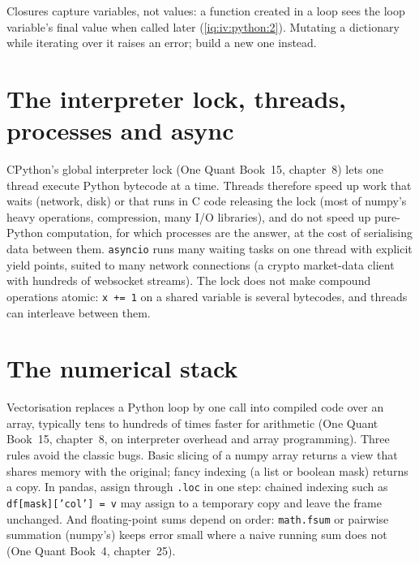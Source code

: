 \label{lst:iv:python:pipeline}

Closures capture variables, not values: a function created in a loop sees the loop variable's final value when called later
(\cref{iq:iv:python:2}). Mutating a dictionary while iterating over it raises an error; build a new one instead.

\section{The interpreter lock, threads, processes and async}

CPython's global interpreter lock (One Quant Book~15, chapter~8) lets one thread execute Python bytecode at a time. Threads
therefore speed up work that waits (network, disk) or that runs in C code releasing the lock (most of numpy's heavy
operations, compression, many I/O libraries), and do not speed up pure-Python computation, for which processes are the answer,
at the cost of serialising data between them. \texttt{asyncio} runs many waiting tasks on one thread with explicit yield points,
suited to many network connections (a crypto market-data client with hundreds of websocket streams). The lock does not make
compound operations atomic: \texttt{x += 1} on a shared variable is several bytecodes, and threads can interleave between them.

\section{The numerical stack}

Vectorisation replaces a Python loop by one call into compiled code over an array, typically tens to hundreds of times faster
for arithmetic (One Quant Book~15, chapter~8, on interpreter overhead and array programming). Three rules avoid the classic bugs.
Basic slicing of a numpy array returns a view that shares memory with the original; fancy indexing (a list or boolean mask)
returns a copy. In pandas, assign through \texttt{.loc} in one step: chained indexing such as \texttt{df[mask]['col'] = v} may assign
to a temporary copy and leave the frame unchanged. And floating-point sums depend on order: \texttt{math.fsum} or pairwise
summation (numpy's) keeps error small where a naive running sum does not (One Quant Book~4, chapter~25).

\label{lst:iv:python:rolling}

